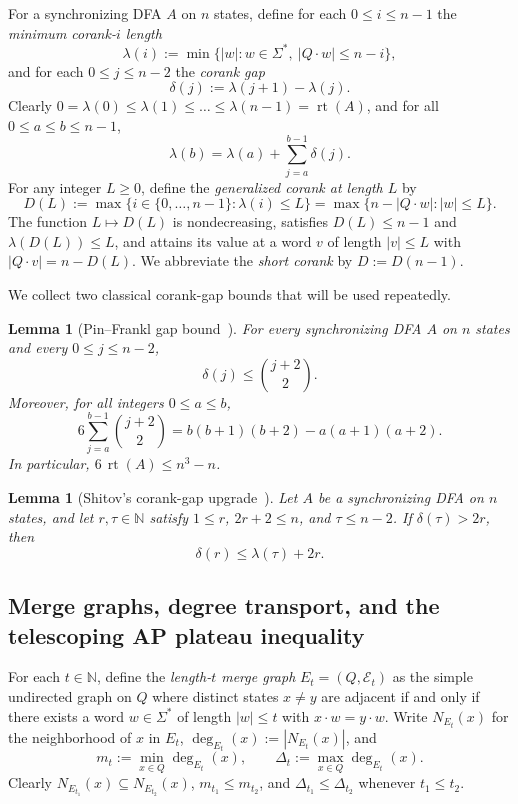 \documentclass[11pt]{article}
\newtheorem{lemma}[theorem]{Lemma}
\theoremstyle{definition}
\theoremstyle{remark}
\newcommand{\rt}{\operatorname{rt}}
\newcommand{\N}{\mathbb{N}}
\begin{document}
For a synchronizing DFA $A$ on $n$ states, define for each $0 \le i \le n - 1$ the \emph{minimum corank-$i$ length}
\[
  \lambda(i) := \min \{ |w| : w \in \Sigma^*,\ |Q \cdot w| \le n - i \},
\]
and for each $0 \le j \le n - 2$ the \emph{corank gap}
\[
  \delta(j) := \lambda(j + 1) - \lambda(j).
\]
Clearly $0 = \lambda(0) \le \lambda(1) \le \dots \le \lambda(n - 1) = \rt(A)$, and for all $0 \le a \le b \le n - 1$,
\[
  \lambda(b) = \lambda(a) + \sum_{j = a}^{b - 1} \delta(j).
\]
For any integer $L \ge 0$, define the \emph{generalized corank at length $L$} by
\[
  D(L) := \max \{ i \in \{0, \dots, n - 1\} : \lambda(i) \le L \}
         = \max \{ n - |Q \cdot w| : |w| \le L \}.
\]
The function $L \mapsto D(L)$ is nondecreasing, satisfies $D(L) \le n - 1$ and $\lambda(D(L)) \le L$, and attains its value at a word $v$ of length $|v| \le L$ with $|Q \cdot v| = n - D(L)$. We abbreviate the \emph{short corank} by $D := D(n - 1)$.

We collect two classical corank-gap bounds that will be used repeatedly.

\begin{lemma}[Pin--Frankl gap bound~\cite{Frankl1982,Pin1983}]\label{lem:pf-gap}
For every synchronizing DFA $A$ on $n$ states and every $0 \le j \le n - 2$,
\[
  \delta(j) \le \binom{j + 2}{2}.
\]
Moreover, for all integers $0 \le a \le b$,
\[
  6 \sum_{j = a}^{b - 1} \binom{j + 2}{2} = b(b + 1)(b + 2) - a(a + 1)(a + 2).
\]
In particular, $6\, \rt(A) \le n^3 - n$.
\end{lemma}

\begin{lemma}[Shitov's corank-gap upgrade~\cite{Shitov2019}]\label{lem:shitov-gap}
Let $A$ be a synchronizing DFA on $n$ states, and let $r, \tau \in \N$ satisfy $1 \le r$, $2r + 2 \le n$, and $\tau \le n - 2$. If $\delta(\tau) > 2r$, then
\[
  \delta(r) \le \lambda(\tau) + 2r.
\]
\end{lemma}

\subsection{Merge graphs, degree transport, and the telescoping AP plateau inequality}

For each $t \in \N$, define the \emph{length-$t$ merge graph} $E_t = (Q, \mathcal{E}_t)$ as the simple undirected graph on $Q$ where distinct states $x \ne y$ are adjacent if and only if there exists a word $w \in \Sigma^*$ of length $|w| \le t$ with $x \cdot w = y \cdot w$. Write $N_{E_t}(x)$ for the neighborhood of $x$ in $E_t$, $\deg_{E_t}(x) := |N_{E_t}(x)|$, and
\[
  m_t := \min_{x \in Q} \deg_{E_t}(x), \qquad \Delta_t := \max_{x \in Q} \deg_{E_t}(x).
\]
Clearly $N_{E_{t_1}}(x) \subseteq N_{E_{t_2}}(x)$, $m_{t_1} \le m_{t_2}$, and $\Delta_{t_1} \le \Delta_{t_2}$ whenever $t_1 \le t_2$.
\end{document}
